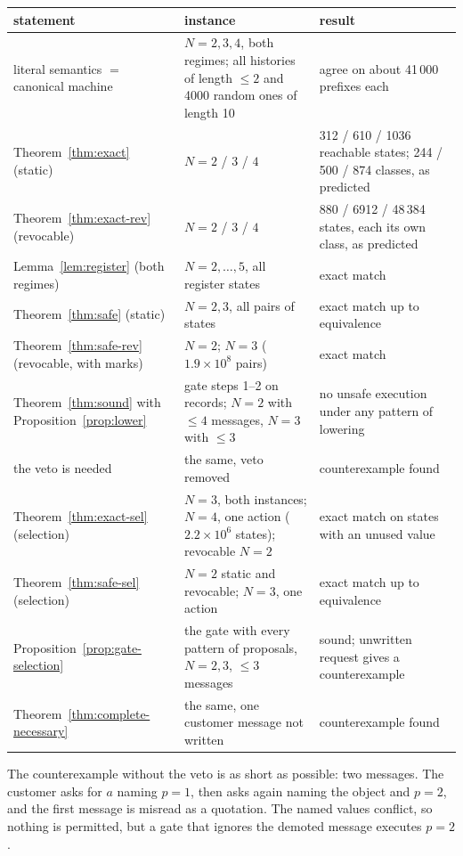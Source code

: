 \begin{center}
\small
\begin{tabular}{p{}p{}p{}}
\hline
statement & instance & result \\
\hline
literal semantics $=$ canonical machine & $N = 2, 3, 4$, both regimes; all histories of length
  $\le 2$ and 4000 random ones of length 10 & agree on about 41\,000 prefixes each \\
Theorem~\ref{thm:exact} (static) & $N = 2$ / $3$ / $4$ & 312 / 610 / 1036 reachable states;
  244 / 500 / 874 classes, as predicted \\
Theorem~\ref{thm:exact-rev} (revocable) & $N = 2$ / $3$ / $4$ & 880 / 6912 / 48\,384 states,
  each its own class, as predicted \\
Lemma~\ref{lem:register} (both regimes) & $N = 2, \dots, 5$, all register states & exact match \\
Theorem~\ref{thm:safe} (static) & $N = 2, 3$, all pairs of states & exact match up to equivalence \\
Theorem~\ref{thm:safe-rev} (revocable, with marks) & $N = 2$; $N = 3$ ($1.9 \times 10^8$ pairs) &
  exact match \\
Theorem~\ref{thm:sound} with Proposition~\ref{prop:lower} & gate steps 1--2 on records; $N = 2$
  with $\le 4$ messages, $N = 3$ with $\le 3$ & no unsafe execution under any pattern of lowering \\
the veto is needed & the same, veto removed & counterexample found \\
Theorem~\ref{thm:exact-sel} (selection) & $N = 3$, both instances; $N = 4$, one action
  ($2.2 \times 10^6$ states); revocable $N = 2$ & exact match on states with an unused value \\
Theorem~\ref{thm:safe-sel} (selection) & $N = 2$ static and revocable; $N = 3$, one action & exact
  match up to equivalence \\
Proposition~\ref{prop:gate-selection} & the gate with every pattern of proposals, $N = 2, 3$,
  $\le 3$ messages & sound; unwritten request gives a counterexample \\
Theorem~\ref{thm:complete-necessary} & the same, one customer message not written & counterexample found \\
\hline
\end{tabular}
\end{center}

The counterexample without the veto is as short as possible: two messages. The customer asks for $a$ naming
$p = 1$, then asks again naming the object and $p = 2$, and the first message is misread as a
quotation. The named values conflict, so nothing is permitted, but a gate that ignores the demoted
message executes $p = 2$.

